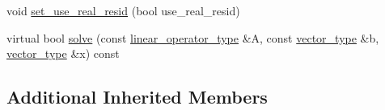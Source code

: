 \begin{DoxyCompactItemize}
\item 
void \hyperlink{classnumerical__algos_1_1lin__solvers_1_1bicgstabl_a384c0d158f1f920be404a0165672965f}{set\-\_\-use\-\_\-real\-\_\-resid} (bool use\-\_\-real\-\_\-resid)
\item 
virtual bool \hyperlink{classnumerical__algos_1_1lin__solvers_1_1bicgstabl_a2dd4f6cdd207b1a77aa94831fbdf9839}{solve} (const \hyperlink{classnumerical__algos_1_1lin__solvers_1_1bicgstabl_a01e654bee784fc6e5fae7b02dd408523}{linear\-\_\-operator\-\_\-type} \&A, const \hyperlink{classnumerical__algos_1_1lin__solvers_1_1bicgstabl_add3b80f2998237878d4cbe24478bcf53}{vector\-\_\-type} \&b, \hyperlink{classnumerical__algos_1_1lin__solvers_1_1bicgstabl_add3b80f2998237878d4cbe24478bcf53}{vector\-\_\-type} \&x) const 
\end{DoxyCompactItemize}
\subsection*{Additional Inherited Members}


